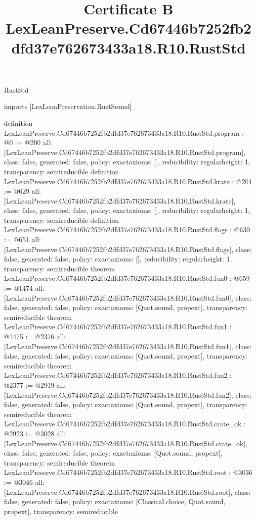 \begin{lexlean}{RustStd}
\title{Certificate B LexLeanPreserve.Cd67446b7252fb2dfd37e762673433a18.R10.RustStd}
\begin{coremodule}
imports [LexLeanPreservation.RustSound]

definition LexLeanPreserve.Cd67446b7252fb2dfd37e762673433a18.R10.RustStd.program : @0 := @200 {
  all: [LexLeanPreserve.Cd67446b7252fb2dfd37e762673433a18.R10.RustStd.program],
  class: false,
  generated: false,
  policy: exact{axioms: []},
  reducibility: regular{height: 1},
  transparency: semireducible
}
definition LexLeanPreserve.Cd67446b7252fb2dfd37e762673433a18.R10.RustStd.krate : @201 := @629 {
  all: [LexLeanPreserve.Cd67446b7252fb2dfd37e762673433a18.R10.RustStd.krate],
  class: false,
  generated: false,
  policy: exact{axioms: []},
  reducibility: regular{height: 1},
  transparency: semireducible
}
definition LexLeanPreserve.Cd67446b7252fb2dfd37e762673433a18.R10.RustStd.flags : @630 := @651 {
  all: [LexLeanPreserve.Cd67446b7252fb2dfd37e762673433a18.R10.RustStd.flags],
  class: false,
  generated: false,
  policy: exact{axioms: []},
  reducibility: regular{height: 1},
  transparency: semireducible
}
theorem LexLeanPreserve.Cd67446b7252fb2dfd37e762673433a18.R10.RustStd.fun0 : @659 := @1474 {
  all: [LexLeanPreserve.Cd67446b7252fb2dfd37e762673433a18.R10.RustStd.fun0],
  class: false,
  generated: false,
  policy: exact{axioms: [Quot.sound, propext]},
  transparency: semireducible
}
theorem LexLeanPreserve.Cd67446b7252fb2dfd37e762673433a18.R10.RustStd.fun1 : @1475 := @2376 {
  all: [LexLeanPreserve.Cd67446b7252fb2dfd37e762673433a18.R10.RustStd.fun1],
  class: false,
  generated: false,
  policy: exact{axioms: [Quot.sound, propext]},
  transparency: semireducible
}
theorem LexLeanPreserve.Cd67446b7252fb2dfd37e762673433a18.R10.RustStd.fun2 : @2377 := @2919 {
  all: [LexLeanPreserve.Cd67446b7252fb2dfd37e762673433a18.R10.RustStd.fun2],
  class: false,
  generated: false,
  policy: exact{axioms: [Quot.sound, propext]},
  transparency: semireducible
}
theorem LexLeanPreserve.Cd67446b7252fb2dfd37e762673433a18.R10.RustStd.crate_ok : @2923 := @3028 {
  all: [LexLeanPreserve.Cd67446b7252fb2dfd37e762673433a18.R10.RustStd.crate_ok],
  class: false,
  generated: false,
  policy: exact{axioms: [Quot.sound, propext]},
  transparency: semireducible
}
theorem LexLeanPreserve.Cd67446b7252fb2dfd37e762673433a18.R10.RustStd.root : @3036 := @3046 {
  all: [LexLeanPreserve.Cd67446b7252fb2dfd37e762673433a18.R10.RustStd.root],
  class: false,
  generated: false,
  policy: exact{axioms: [Classical.choice, Quot.sound, propext]},
  transparency: semireducible
}


\end{coremodule}
\end{lexlean}
